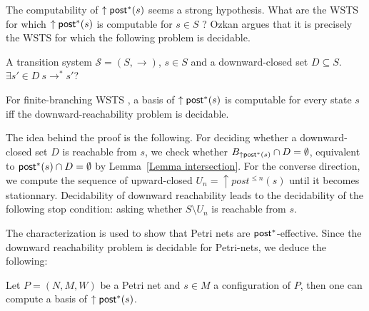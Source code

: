 \iffalse
\alain{definir downward reachability problem.....
downward-closed problem given a state $s$ of a WSTS
with strong upward compatibility 
and a decidable downward-closed set $D$, it can be decided whether $\exists s' \in D ~ s \to^* s'$. }
\fi


The computability of $\uparrow \textsf{post}^*(s)$ seems a strong hypothesis. What are the WSTS for which $\uparrow \textsf{post}^*(s)$ is computable for $s \in S$ ?
Ozkan \cite{DBLP:conf/gg/Ozkan22} argues that it is precisely the WSTS for which the following problem is decidable.

{A transition system $\mathscr{S}=(S,\rightarrow)$, $s \in S$ and a downward-closed set $D
\subseteq S$.}
{$\exists s' \in D ~ s \to^* s'$? \newline}



\begin{proposition}
For finite-branching WSTS%
, a basis of $\uparrow \textsf{post}^*(s)$ is computable for every state $s$ iff the downward-reachability problem is decidable.
\end{proposition}

The idea behind the proof is the following. For deciding whether a downward-closed set $D$ is reachable from $s$, we check whether
$B_{\uparrow \textsf{post}^*(s)} \cap D = \emptyset$, equivalent to $\textsf{post}^*(s)\cap D = \emptyset$ by
Lemma~\ref{Lemma intersection}. For the converse direction, we compute the sequence of upward-closed
$U_n = \uparrow post^{\leq n}(s)$ until it becomes stationnary. 
Decidability of downward reachability leads to the decidability of the following stop condition:
asking whether $S \setminus U_n$ is reachable from $s$.


The characterization is used to show that Petri nets are $\textsf{post}^*$-effective. Since the downward reachability problem is decidable for Petri-nets, we deduce the following:

\begin{proposition}
Let $P = (N,M,W)$ be a Petri net and $s \in M$ a configuration of $P$, then one can compute a basis of $\uparrow \textsf{post}^*(s)$.
\end{proposition}

